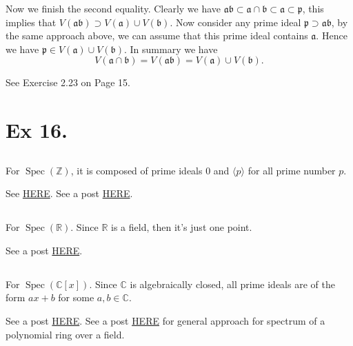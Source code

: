 \noindent Now we finish the second equality. Clearly we have $\mathfrak a\mathfrak b\subset \mathfrak a\cap \mathfrak b\subset \mathfrak a\subset \mathfrak p$, this implies that $V(\mathfrak{ab})\supset V(\mathfrak a)\cup V(\mathfrak b)$. Now consider any prime ideal $\mathfrak p\supset \mathfrak {ab}$, by the same approach above, we can assume that this prime ideal contains $\mathfrak a$. Hence we have $\mathfrak p\in V(\mathfrak a)\cup V(\mathfrak b)$.
In summary we have $$V(\mathfrak a\cap \mathfrak b)=V(\mathfrak{ab})=V(\mathfrak a)\cup V(\mathfrak b).$$

See \cite{altman} Exercise 2.23 on Page 15. 



\section{Ex 16.}

\subsection{}
For $\operatorname{Spec}(\mathbb Z)$, it is composed of prime ideals $0$ and $\langle p\rangle$ for all prime number $p$.

See \href{https://ncatlab.org/nlab/show/Spec%28Z%29}{HERE}. 
See a post \href{https://math.stackexchange.com/questions/4008952/drawing-a-picture-of-operatornamespec-mathbbz}{HERE}. 

\subsection{}
For $\operatorname{Spec}(\mathbb R)$.
Since $\mathbb R$ is a field, then it's just one point.

See a post \href{https://math.stackexchange.com/questions/1258959/prime-ideals-in-a-field}{HERE}. 

\subsection{}
For $\operatorname{Spec}(\mathbb C[x])$.
Since $\mathbb C$ is algebraically closed, all prime ideals are of the form $ax+b$ for some $a,b\in\mathbb C$.

See a post \href{https://math.stackexchange.com/questions/838431/studying-operatornamespec-mathbbzx-operatornamespec-mathbbrx}{HERE}.
See a post \href{https://math.stackexchange.com/questions/1856918/comparing-the-prime-spectra-of-mathbbqx-mathbbrx-and-mathbbcx}{HERE} for general approach for spectrum of a polynomial ring over a field.


